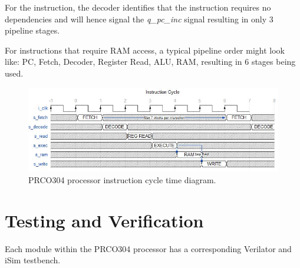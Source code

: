 \documentclass[11pt,a4paper]{report}
\newcommand{\scname}{PRCO304}
\begin{document}
For the {} instruction, the decoder identifies that the instruction requires no dependencies and will hence signal the \textit{q\_pc\_inc} signal resulting in only 3 pipeline stages.

For instructions that require RAM access, a typical pipeline order might look like: PC, Fetch, Decoder, Register Read, ALU, RAM, resulting in 6 stages being used.

\begin{figure}[H]
\begin{center}
\includegraphics[scale=0.8]{td_instr}
\end{center}
\caption{\scname{} processor instruction cycle time diagram.}
\label{fig:dft_algorithm}
\end{figure}

\section{Testing and Verification}
\label{sect:core_test}
Each module within the \scname{} processor has a corresponding Verilator and iSim testbench.
\end{document}
